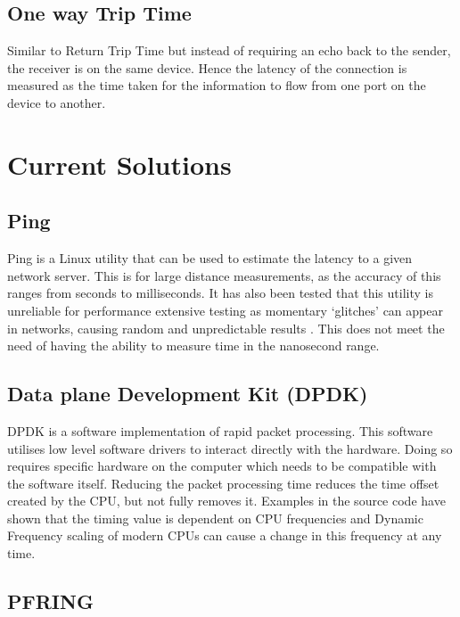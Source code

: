 \subsection{One way Trip Time}

Similar to Return Trip Time but instead of requiring an echo back to the sender, the receiver is on the
same device. Hence the latency of the connection is measured as the time taken for the information
to flow from one port on the device to another.

\section{Current Solutions}

\subsection{Ping}

Ping is a Linux utility that can be used to estimate the latency to a given network server. 
This is for large distance measurements, as the accuracy of this ranges from seconds to milliseconds. 
It has also been tested that this utility is unreliable for performance extensive testing as momentary ‘glitches’ can appear in networks, causing random and unpredictable results \cite{pingisbad}.
This does not meet the need of having the ability to measure time in the nanosecond range.

\subsection{Data plane Development Kit (DPDK)}

DPDK is a software implementation of rapid packet processing. 
This software utilises low level software drivers to interact directly with the hardware. 
Doing so requires specific hardware on the computer which needs to be compatible with the software itself.
Reducing the packet processing time reduces the time offset created by the CPU, but not fully removes it. 
Examples in the source code have shown that the timing value is dependent on CPU frequencies \cite{dpdkcode} and Dynamic Frequency scaling \cite{turboboost} of modern CPUs can cause a change in this frequency at any time.

\subsection{PF\textunderscore RING}

